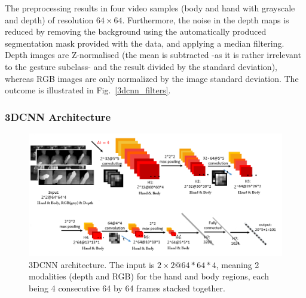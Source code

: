 The preprocessing results in four video samples (body and hand with grayscale and depth) of resolution $64\times64$. 
Furthermore, the noise in the depth maps is reduced by removing the background using the automatically produced 
segmentation mask provided with the data, and applying a  median filtering.
%
Depth images are Z-normalised (the mean is subtracted -as it is rather irrelevant to the gesture subclass- 
and the result divided by the standard deviation), whereas 
RGB images are only normalized by the image standard deviation.
The outcome is illustrated in Fig.~\ref{3dcnn_filters}.


\subsubsection{3DCNN Architecture}
\begin{figure}[t]
  \centering
  \includegraphics[width=.9\textwidth]{images/3DCNN_new}
\vspace*{-2mm}
  \caption{3DCNN architecture. The input is $2\times2@64\ast64\ast4$, meaning 2 modalities (depth and RGB)  for the hand and body regions, 
each  being 4  consecutive 64 by 64 frames stacked together. 
%
}
\label{3dcnn_architecture}
\end{figure}

